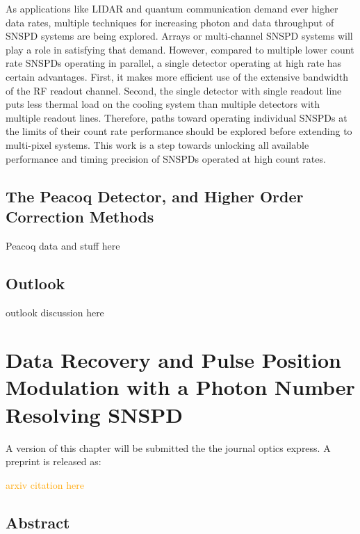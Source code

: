 \documentclass[11pt]{caltech_thesis} %
\begin{document}
As applications like LIDAR and quantum communication demand ever higher
data rates, multiple techniques for increasing photon and data
throughput of SNSPD systems are being explored. Arrays or multi-channel
SNSPD systems will play a role in satisfying that demand. However,
compared to multiple lower count rate SNSPDs operating in parallel, a
single detector operating at high rate has certain advantages. First, it
makes more efficient use of the extensive bandwidth of the RF readout
channel. Second, the single detector with single readout line puts less
thermal load on the cooling system than multiple detectors with multiple
readout lines. Therefore, paths toward operating individual SNSPDs at
the limits of their count rate performance should be explored before
extending to multi-pixel systems. This work is a step towards unlocking
all available performance and timing precision of SNSPDs operated at
high count rates.

\hypertarget{the-peacoq-detector-and-higher-order-correction-methods}{%
\section{The Peacoq Detector, and Higher Order Correction
Methods}\label{the-peacoq-detector-and-higher-order-correction-methods}}

Peacoq data and stuff here

{}

\hypertarget{outlook}{%
\section{Outlook}\label{outlook}}

outlook discussion here

\hypertarget{data-recovery-and-pulse-position-modulation-with-a-photon-number-resolving-snspd}{%
\chapter{Data Recovery and Pulse Position Modulation with a Photon
Number Resolving
SNSPD}\label{data-recovery-and-pulse-position-modulation-with-a-photon-number-resolving-snspd}}

A version of this chapter will be submitted the the journal optics
express. A preprint is released as:

\textcolor{orange}{arxiv citation here}

\hypertarget{abstract-2}{%
\section{Abstract}\label{abstract-2}}
\end{document}
